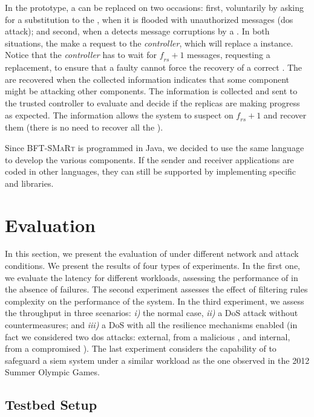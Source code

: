 In the prototype, a \presieve can be replaced on two occasions: first, voluntarily by asking for a substitution to the \repsieves, when it is flooded with unauthorized messages (\gls{dos} attack); and second, when a \repsieve detects message corruptions by a \presieve.
In both situations, the \repsieves make a request to the \emph{controller}, which will replace a \presieve instance.
Notice that the \emph{controller} has to wait for $\mathit{f_{rs}+1}$ messages, requesting a \presieve replacement, to ensure that a faulty \repsieve cannot force the recovery of a correct \presieve.
The \repsieves are recovered when the collected information indicates that some component might be attacking other components.
The information is collected and sent to the trusted controller to evaluate and decide if the replicas are making progress as expected.
The information allows the system to suspect on $\mathit{f_{rs}+1}$ \repsieves and recover them (there is no need to recover all the \repsieves).


Since \textsc{BFT-SMaRt} is programmed in Java, we decided to use the same language to develop the various \sieveq components. 
If the sender and receiver applications are coded in other languages, they can still be supported by implementing specific \sender and \postsieve libraries.


\section{Evaluation}
\label{evaluation}


In this section, we present the evaluation of \sieveq under different network and attack conditions.
We present the results of four types of experiments.
In the first one, we evaluate the latency for different \sender workloads, assessing the performance of \sieveq in the absence of failures.
The second experiment assesses the effect of filtering rules complexity on the performance of the system.
In the third experiment, we assess the throughput in three scenarios: \emph{i)} the normal case, \emph{ii)} a DoS attack without countermeasures; and \emph{iii)} a DoS with all the resilience mechanisms enabled (in fact we considered two \gls{dos} attacks: external, from a malicious \sender, and internal, from a compromised \repsieve).
The last experiment considers the capability of \sieveq to safeguard a \gls{siem} system under a similar workload as the one observed in the 2012 Summer Olympic Games.

\subsection{Testbed Setup}

